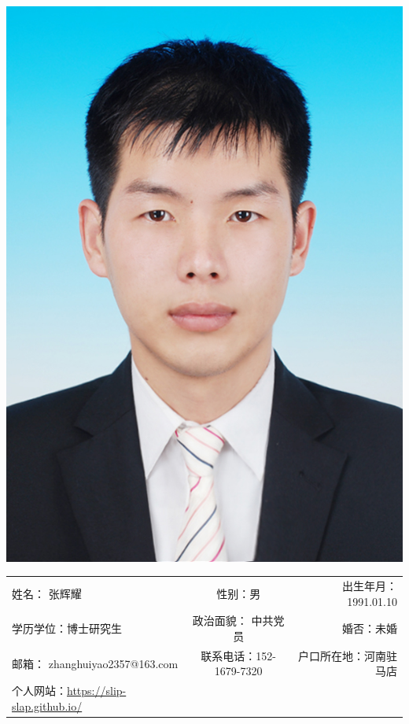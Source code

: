 
\begin{minipage}{0.2\textwidth}
	\includegraphics[scale=1.1]{8574.png}
\end{minipage}
\hfill
\begin{minipage}{0.8\textwidth}
	\renewcommand{\arraystretch}{2.2}
	\begin{adjustbox}{width=1\linewidth}
		\begin{tabular}{lcr}
			姓名： 张辉耀 & 性别：男 & 出生年月：1991.01.10 \\
			学历学位：博士研究生 & 政治面貌： 中共党员 & 婚否：未婚 \\
			邮箱： zhanghuiyao2357@163.com & 联系电话：152-1679-7320 & 户口所在地：河南驻马店 \\
			个人网站：\url{https://slip-slap.github.io/} & & 
		\end{tabular}
	\renewcommand{\arraystretch}{0.5}
	\end{adjustbox}
\end{minipage}




